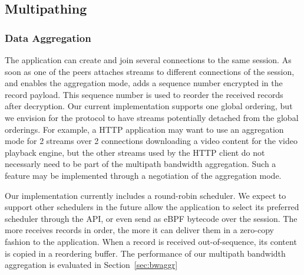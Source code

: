 


\subsection{Multipathing}

\subsubsection{Data Aggregation}
The application can create and join several \tcp connections to
the same \tcpls session. As soon as one of the peers attaches streams to
different \tcp connections of the session, and enables the aggregation mode,
\tcpls adds a sequence number encrypted in the \tls record payload. This
sequence number is used to reorder the received records after decryption. Our
current implementation supports one global ordering, but
we envision for the \tcpls protocol to have streams potentially detached from
the global orderings. For example, a HTTP application may want to use an
aggregation mode for 2 streams over 2 \tcp connections downloading a video
content for the video playback engine, but the other streams used by the HTTP
client do not necessarly need to be part of the multipath bandwidth aggregation.
Such a feature may be implemented through a negotiation of the aggregation
mode.

Our implementation currently includes a round-robin scheduler. We expect to
support other schedulers in the future allow the application to select its preferred scheduler through the API, or even send as eBPF bytecode over the session. The more \tcpls receives records in order, the more it can deliver them in a zero-copy fashion to the application.
When a record is received out-of-sequence, its content is copied in
a reordering buffer. The performance of our multipath
bandwidth aggregation is evaluated in Section~\ref{sec:bwaggr}

